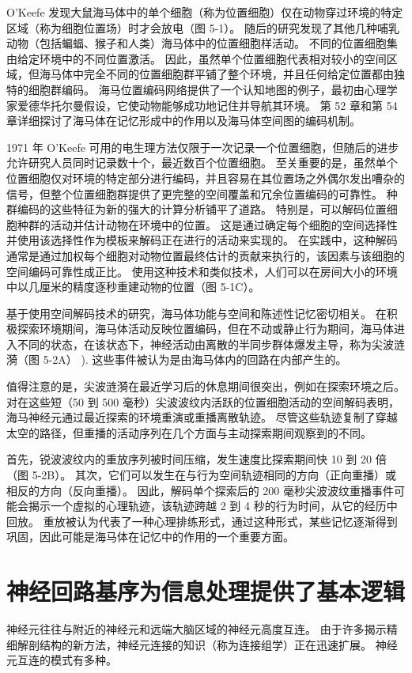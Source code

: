 O’Keefe 发现大鼠海马体中的单个细胞（称为位置细胞）仅在动物穿过环境的特定区域（称为细胞位置场）时才会放电（图 5-1）。 随后的研究发现了其他几种哺乳动物（包括蝙蝠、猴子和人类）海马体中的位置细胞样活动。 不同的位置细胞集由给定环境中的不同位置激活。 因此，虽然单个位置细胞代表相对较小的空间区域，但海马体中完全不同的位置细胞群平铺了整个环境，并且任何给定位置都由独特的细胞群编码。 海马位置编码网络提供了一个认知地图的例子，最初由心理学家爱德华托尔曼假设，它使动物能够成功地记住并导航其环境。 第 52 章和第 54 章详细探讨了海马体在记忆形成中的作用以及海马体空间图的编码机制。

1971 年 O’Keefe 可用的电生理方法仅限于一次记录一个位置细胞，但随后的进步允许研究人员同时记录数十个，最近数百个位置细胞。 至关重要的是，虽然单个位置细胞仅对环境的特定部分进行编码，并且容易在其位置场之外偶尔发出嘈杂的信号，但整个位置细胞群提供了更完整的空间覆盖和冗余位置编码的可靠性。 种群编码的这些特征为新的强大的计算分析铺平了道路。 特别是，可以解码位置细胞种群的活动并估计动物在环境中的位置。 这是通过确定每个细胞的空间选择性并使用该选择性作为模板来解码正在进行的活动来实现的。 在实践中，这种解码通常是通过加权每个细胞对动物位置最终估计的贡献来执行的，该因素与该细胞的空间编码可靠性成正比。 使用这种技术和类似技术，人们可以在房间大小的环境中以几厘米的精度逐秒重建动物的位置（图 5-1C）。


基于使用空间解码技术的研究，海马体功能与空间和陈述性记忆密切相关。 在积极探索环境期间，海马体活动反映位置编码，但在不动或静止行为期间，海马体进入不同的状态，在该状态下，神经活动由离散的半同步群体爆发主导，称为尖波涟漪（图 5-2A） ). 这些事件被认为是由海马体内的回路在内部产生的。

值得注意的是，尖波涟漪在最近学习后的休息期间很突出，例如在探索环境之后。 对在这些短（50 到 500 毫秒）尖波波纹内活跃的位置细胞活动的空间解码表明，海马神经元通过最近探索的环境重演或重播离散轨迹。 尽管这些轨迹复制了穿越太空的路径，但重播的活动序列在几个方面与主动探索期间观察到的不同。

首先，锐波波纹内的重放序列被时间压缩，发生速度比探索期间快 10 到 20 倍（图 5-2B）。 其次，它们可以发生在与行为空间轨迹相同的方向（正向重播）或相反的方向（反向重播）。 因此，解码单个探索后的 200 毫秒尖波波纹重播事件可能会揭示一个虚拟的心理轨迹，该轨迹跨越 2 到 4 秒的行为时间，从它的经历中回放。 重放被认为代表了一种心理排练形式，通过这种形式，某些记忆逐渐得到巩固，因此可能是海马体在记忆中的作用的一个重要方面。


\section{神经回路基序为信息处理提供了基本逻辑}
神经元往往与附近的神经元和远端大脑区域的神经元高度互连。 由于许多揭示精细解剖结构的新方法，神经元连接的知识（称为连接组学）正在迅速扩展。 神经元互连的模式有多种。

